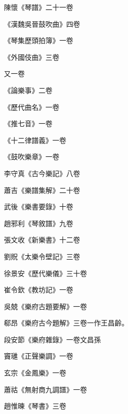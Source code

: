 \begin{pinyinscope}
 陳懷《琴譜》二十一卷



 《漢魏吳晉鼓吹曲》四卷



 《琴集歷頭拍簿》一卷



 《外國伎曲》三卷



 又一卷



 《論樂事》二卷



 《歷代曲名》一卷



 《推七音》一卷



 《十二律譜義》一卷



 《鼓吹樂章》一卷



 李守真《古今樂記》八卷



 蕭吉《樂譜集解》二十卷



 武後《樂書要錄》十卷



 趙邪利《琴敘譜》九卷



 張文收《新樂書》十二卷



 劉貺《太樂令壁記》三卷



 徐景安《歷代樂儀》三十卷



 崔令欽《教坊記》一卷



 吳兢《樂府古題要解》一卷



 郗昂《樂府古今題解》三卷一作王昌齡。



 段安節《樂府雜錄》一卷文昌孫



 竇璡《正聲樂調》一卷



 玄宗《金鳳樂》一卷



 蕭祜《無射商九調譜》一卷



 趙惟暕《琴書》三卷




\end{pinyinscope}
